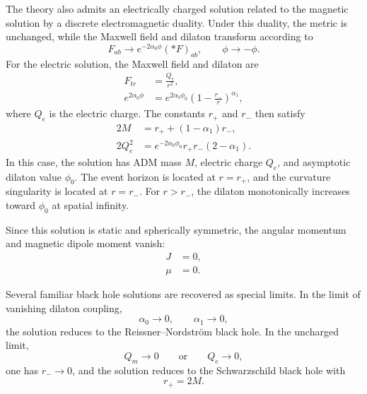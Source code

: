 The theory also admits an electrically charged solution related to the magnetic solution by a discrete electromagnetic duality. Under this duality, the metric is unchanged, while the Maxwell field and dilaton transform according to
\begin{equation}
F_{ab} \to e^{-2\alpha_0\phi}(*F)_{ab},
\qquad
\phi \to -\phi .
\end{equation}
For the electric solution, the Maxwell field and dilaton are
\begin{align}
F_{tr} &= \frac{Q_e}{r^2}, \\
e^{2\alpha_0\phi}
&=
e^{2\alpha_0\phi_0}
\left(1-\frac{r_-}{r}\right)^{\alpha_1},
\end{align}
where \(Q_e\) is the electric charge. The constants \(r_+\) and \(r_-\) then satisfy
\begin{align}
2M &= r_+ + \left(1-\alpha_1\right)r_- , \\
2Q_e^2
&=
e^{-2\alpha_0\phi_0}
r_+ r_-
\left(2-\alpha_1\right).
\end{align}
In this case, the solution has ADM mass \(M\), electric charge \(Q_e\), and asymptotic dilaton value \(\phi_0\). The event horizon is located at \(r=r_+\), and the curvature singularity is located at \(r=r_-\). For \(r>r_-\), the dilaton monotonically increases toward \(\phi_0\) at spatial infinity.

Since this solution is static and spherically symmetric, the angular momentum and magnetic dipole moment vanish:
\begin{align}
J &= 0, \\
\mu &= 0 .
\end{align}

Several familiar black hole solutions are recovered as special limits. In the limit of vanishing dilaton coupling,
\begin{equation}
\alpha_0 \to 0,
\qquad
\alpha_1 \to 0,
\end{equation}
the solution reduces to the Reissner--Nordstr\"om black hole. In the uncharged limit,
\begin{equation}
Q_m \to 0
\qquad
\text{or}
\qquad
Q_e \to 0,
\end{equation}
one has \(r_- \to 0\), and the solution reduces to the Schwarzschild black hole with
\begin{equation}
r_+ = 2M .
\end{equation}

